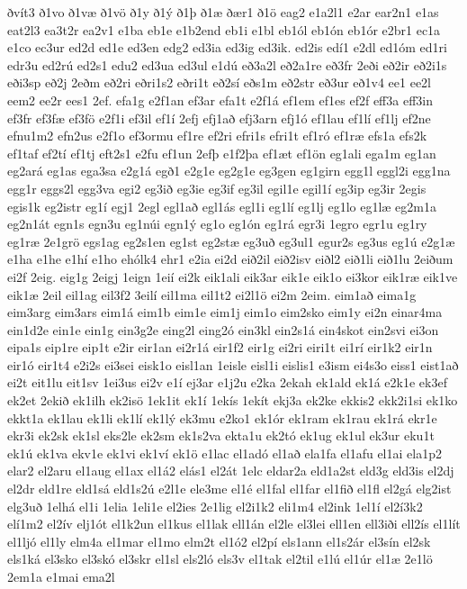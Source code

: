 {ðvít3
ð1vo
ð1væ
ð1vö
ð1y
ð1ý
ð1þ
ð1æ
ðær1
ð1ö
eag2
e1a2l1
e2ar
ear2n1
e1as
eat2l3
ea3t2r
ea2v1
e1ba
eb1e
e1b2end
eb1i
e1bl
eb1ól
eb1ón
eb1ór
e2br1
ec1a
e1co
ec3ur
ed2d
ed1e
ed3en
edg2
ed3ia
ed3ig
ed3ik.
ed2is
edí1
e2dl
ed1óm
ed1ri
edr3u
ed2rú
ed2s1
edu2
ed3ua
ed3ul
e1dú
eð3a2l
eð2a1re
eð3fr
2eði
eð2ir
eð2i1s
eði3sp
eð2j
2eðm
eð2ri
eðri1s2
eðri1t
eð2sí
eðs1m
eð2str
eð3ur
eð1v4
ee1
ee2l
eem2
ee2r
ees1
2ef.
efa1g
e2f1an
ef3ar
efa1t
e2f1á
ef1em
ef1es
ef2f
eff3a
eff3in
ef3fr
ef3fæ
ef3fö
e2f1i
ef3il
ef1í
2efj
efj1að
efj3arn
efj1ó
ef1lau
ef1lí
ef1lj
ef2ne
efnu1m2
efn2us
e2f1o
ef3ormu
ef1re
ef2ri
efri1s
efri1t
ef1ró
ef1ræ
efs1a
efs2k
ef1taf
ef2tí
ef1tj
eft2s1
e2fu
ef1un
2efþ
e1f2þa
ef1æt
ef1ön
eg1ali
ega1m
eg1an
eg2ará
eg1as
ega3sa
e2g1á
egð1
e2g1e
eg2g1e
eg3gen
eg1girn
egg1l
eggl2i
egg1na
egg1r
eggs2l
egg3va
egi2
eg3ið
eg3ie
eg3if
eg3il
egil1e
egil1í
eg3ip
eg3ir
2egis
egis1k
eg2istr
eg1í
egj1
2egl
egl1að
egl1ás
egl1i
eg1lí
eg1lj
eg1lo
eg1læ
eg2m1a
eg2n1át
egn1s
egn3u
eg1núi
egn1ý
eg1o
eg1ón
eg1rá
egr3i
1egro
egr1u
eg1ry
eg1ræ
2e1grö
egs1ag
eg2s1en
eg1st
eg2stæ
eg3uð
eg3ul1
egur2s
eg3us
eg1ú
e2g1æ
e1ha
e1he
e1hí
e1ho
ehólk4
ehr1
e2ia
ei2d
eið2il
eið2isv
eiðl2
eið1li
eið1lu
2eiðum
ei2f
2eig.
eig1g
2eigj
1eign
1eií
ei2k
eik1ali
eik3ar
eik1e
eik1o
ei3kor
eik1ræ
eik1ve
eik1æ
2eil
eil1ag
eil3f2
3eilí
eil1ma
eil1t2
ei2l1ö
ei2m
2eim.
eim1að
eima1g
eim3arg
eim3ars
eim1á
eim1b
eim1e
eim1j
eim1o
eim2sko
eim1y
ei2n
einar4ma
ein1d2e
ein1e
ein1g
ein3g2e
eing2l
eing2ó
ein3kl
ein2s1á
ein4skot
ein2svi
ei3on
eipa1s
eip1re
eip1t
e2ir
eir1an
ei2r1á
eir1f2
eir1g
ei2ri
eiri1t
ei1rí
eir1k2
eir1n
eir1ó
eir1t4
e2i2s
ei3sei
eisk1o
eisl1an
1eisle
eisl1i
eislis1
e3ism
ei4s3o
eiss1
eist1að
ei2t
eit1lu
eit1sv
1ei3us
ei2v
e1í
ej3ar
e1j2u
e2ka
2ekah
ek1ald
ek1á
e2k1e
ek3ef
ek2et
2ekið
ek1ilh
ek2isö
1ek1it
ek1í
1ekís
1ekít
ekj3a
ek2ke
ekkis2
ekk2i1si
ek1ko
ekkt1a
ek1lau
ek1li
ek1lí
ek1lý
ek3mu
e2ko1
ek1ór
ek1ram
ek1rau
ek1rá
ekr1e
ekr3i
ek2sk
ek1sl
eks2le
ek2sm
ek1s2va
ekta1u
ek2tó
ek1ug
ek1ul
ek3ur
eku1t
ek1ú
ek1va
ekv1e
ek1vi
ek1ví
ek1ö
e1lac
el1adó
el1að
ela1fa
el1afu
el1ai
ela1p2
elar2
el2aru
el1aug
el1ax
el1á2
elás1
el2át
1elc
eldar2a
eld1a2st
eld3g
eld3is
el2dj
el2dr
eld1re
eld1sá
eld1s2ú
e2l1e
ele3me
el1é
el1fal
el1far
el1fið
el1fl
el2gá
elg2ist
elg3uð
1elhá
el1i
1elia
1eli1e
el2ies
2e1lig
el2i1k2
eli1m4
el2ink
1el1í
el2í3k2
elí1m2
el2ív
elj1ót
el1k2un
el1kus
el1lak
ell1án
el2le
el3lei
ell1en
ell3iði
ell2ís
el1lít
el1ljó
el1ly
elm4a
el1mar
el1mo
elm2t
el1ó2
el2pí
els1ann
el1s2ár
el3sín
el2sk
els1ká
el3sko
el3skó
el3skr
el1sl
els2ló
els3v
el1tak
el2til
e1lú
el1úr
el1æ
2e1lö
2em1a
e1mai
ema2l
}
